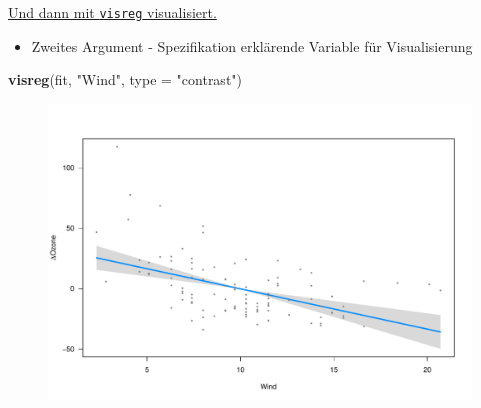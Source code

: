 \documentclass[ignorenonframetext,]{beamer}
\newenvironment{Shaded}{}{}
\newcommand{\KeywordTok}[1]{\textcolor[rgb]{0.00,0.44,0.13}{\textbf{{#1}}}}
\newcommand{\DataTypeTok}[1]{\textcolor[rgb]{0.56,0.13,0.00}{{#1}}}
\newcommand{\StringTok}[1]{\textcolor[rgb]{0.25,0.44,0.63}{{#1}}}
\newcommand{\NormalTok}[1]{{#1}}
\providecommand{\tightlist}{%
\setlength{\itemsep}{0pt}\setlength{\parskip}{0pt}}
\begin{document}
\begin{frame}[fragile]{\href{http://myweb.uiowa.edu/pbreheny/publications/visreg.pdf}{Und
dann mit \texttt{visreg} visualisiert.}}

\begin{itemize}
\tightlist
\item
  Zweites Argument - Spezifikation erklärende Variable für
  Visualisierung
\end{itemize}

\begin{Shaded}
\begin{Highlighting}[]
\KeywordTok{visreg}\NormalTok{(fit, }\StringTok{"Wind"}\NormalTok{, }\DataTypeTok{type =} \StringTok{"contrast"}\NormalTok{)}
\end{Highlighting}
\end{Shaded}

\begin{figure}[htbp]
\centering
\includegraphics{RSocialScience2_files/figure-beamer/unnamed-chunk-80-1.pdf}
\caption{}
\end{figure}

\end{frame}
\end{document}

